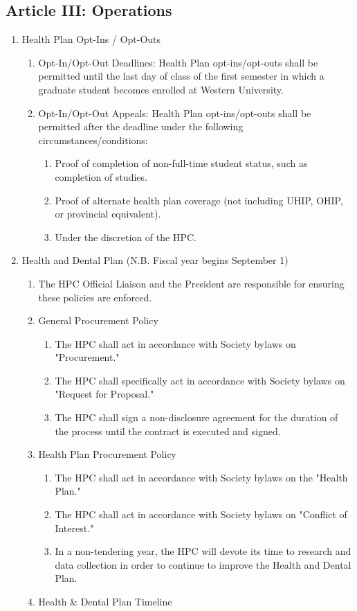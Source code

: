 \subsection{Article III: Operations}
\begin{enumerate}[label*=\arabic*., align=left]
\item Health Plan Opt-Ins / Opt-Outs
\begin{enumerate}[label*=\arabic*., align=left]
\item Opt-In/Opt-Out Deadlines: Health Plan opt-ins/opt-outs shall be permitted until the last day of class of the first semester in which a graduate student becomes enrolled at Western University.
\item Opt-In/Opt-Out Appeals: Health Plan opt-ins/opt-outs shall be permitted after the deadline under the following circumstances/conditions:
\begin{enumerate}[label*=\arabic*., align=left]
\item Proof of completion of non-full-time student status, such as completion of studies.
\item Proof of alternate health plan coverage (not including UHIP, OHIP, or provincial equivalent).
\item Under the discretion of the HPC.
\end{enumerate}
\end{enumerate} 
\item Health and Dental Plan (N.B. Fiscal year begins September 1)
\begin{enumerate} [label*=\arabic*., align=left]	
\item The HPC Official Liaison and the President are responsible for ensuring these policies are enforced.
\item General Procurement Policy
\begin{enumerate}[label*=\arabic*., align=left]	
\item The HPC shall act in accordance with Society bylaws on "Procurement."
\item The HPC shall specifically act in accordance with Society bylaws on "Request for Proposal."
\item The HPC shall sign a non-disclosure agreement for the duration of the process until the contract is executed and signed.
\end{enumerate}
\item Health Plan Procurement Policy
\begin{enumerate} [label*=\arabic*., align=left]	
\item The HPC shall act in accordance with Society bylaws on the "Health Plan."
\item The HPC shall act in accordance with Society bylaws on "Conflict of Interest."
\item In a non-tendering year, the HPC will devote its time to research and data collection in order to continue to improve the Health and Dental Plan.
\end{enumerate}
\item Health \& Dental Plan Timeline


\end{enumerate}
\end{enumerate}
